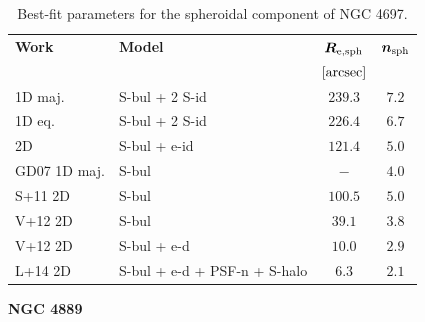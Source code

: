 \documentclass[preprint2]{emulateapj}
\begin{document}
  \begin{table}[h]
  \small
  \caption{Best-fit parameters for the spheroidal component of NGC 4697.}
  \begin{center}
  \begin{tabular}{llcc}
  \hline
  {\bf Work} & {\bf Model}   & $\bm R_{\rm e,sph}$    & $\bm n_{\rm sph}$ \\
    &  &  $[\rm arcsec]$ & \\
  \hline
  1D maj. & S-bul + 2 S-id & $239.3$  &  $7.2$ \\
  1D eq.  & S-bul + 2 S-id & $226.4$  &  $6.7$ \\
  2D      & S-bul + e-id	& $121.4$  &  $5.0$ \\
  \hline
  GD07 1D maj.  & S-bul & $-$  &  $4.0$ \\
  S+11 2D  & S-bul & $100.5$  &  $5.0$ \\
  V+12 2D  & S-bul & $39.1$  &  $3.8$ \\
  V+12 2D  & S-bul + e-d & $10.0$  &  $2.9$ \\
  L+14 2D  & S-bul + e-d + PSF-n + S-halo & $6.3$  &  $2.1$ \\
  \hline
  \end{tabular}
  \end{center}
  \label{tab:n4697}
  \end{table}

  \clearpage\newpage\noindent
  {\bf NGC 4889 \\}
\end{document}

